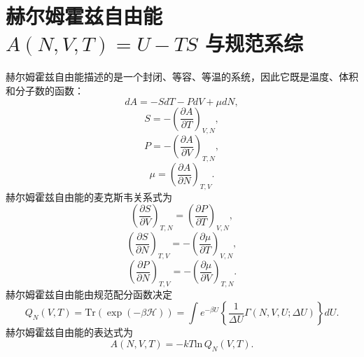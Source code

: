 \section{\texorpdfstring{赫尔姆霍兹自由能 \(A(N,V,T)=U-TS\) 与规范系综}{赫尔姆霍兹自由能 A(N,V,T)=U-TS 与规范系综}}\label{ux8d6bux5c14ux59c6ux970dux5179ux81eaux7531ux80fd-anvtu-ts-ux4e0eux89c4ux8303ux7cfbux7efc}
赫尔姆霍兹自由能描述的是一个封闭、等容、等温的系统，因此它既是温度、体积和分子数的函数：
\begin{equation}\tag{17.10.1}\label{eq:17.10.1}
d A = - S d T - P d V + \mu d N ,
\end{equation}
\begin{equation}\tag{17.10.2}\label{eq:17.10.2}
S = - \left( \frac { \partial A } { \partial T } \right) _ { V , N } ,
\end{equation}
\begin{equation}\tag{17.10.3}\label{eq:17.10.3}
P = - \left( \frac { \partial A } { \partial V } \right) _ { T , N } ,
\end{equation}
\begin{equation}\tag{17.10.4}\label{eq:17.10.4}
\mu = \left( { \frac { \partial A } { \partial N } } \right) _ { T , V } .
\end{equation}
赫尔姆霍兹自由能的麦克斯韦关系式为
\begin{equation}\tag{17.10.5}\label{eq:17.10.5}
\left( \frac { \partial S } { \partial V } \right) _ { T , N } = \left( \frac { \partial P } { \partial T } \right) _ { V , N } ,
\end{equation}
\begin{equation}\tag{17.10.6}\label{eq:17.10.6}
\left( \frac { \partial S } { \partial N } \right) _ { T , V } = - \left( \frac { \partial \mu } { \partial T } \right) _ { V , N } ,
\end{equation}
\begin{equation}\tag{17.10.7}\label{eq:17.10.7}
\left( \frac { \partial P } { \partial N } \right) _ { T , V } = - \left( \frac { \partial \mu } { \partial V } \right) _ { T , N } .
\end{equation}
赫尔姆霍兹自由能由规范配分函数决定
\begin{equation}\tag{17.10.8}\label{eq:17.10.8}
Q _ { N } ( V , T ) = \mathrm { T r } \left( \exp ( - \beta \mathcal { H } ) \right) = \int e ^{- \beta U} \left\{ \frac { 1 } { \Delta U } \Gamma ( N , V , U ; \Delta U ) \right\} d U .
\end{equation}
赫尔姆霍兹自由能的表达式为
\begin{equation}\tag{17.10.9}\label{eq:17.10.9}
A ( N , V , T ) = - k T \mathrm { l n } \, Q _ { N } ( V , T ) .
\end{equation}
